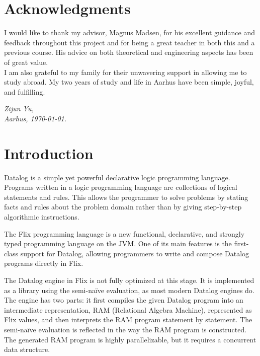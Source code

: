\documentclass[11pt]{report}
\theoremstyle{definition}
\newcommand{\todo}[1]{{\color[rgb]{.5,0,0}\textbf{$\blacktriangleright$#1$\blacktriangleleft$}}}
\begin{document}

\chapter*{Acknowledgments}

I would like to thank my advisor, Magnus Madsen, for his excellent guidance and feedback throughout this project and for being a great teacher in both this and a previous course. His advice on both theoretical and engineering aspects has been of great value.\\
I am also grateful to my family for their unwavering support in allowing me to study abroad. My two years of study and life in Aarhus have been simple, joyful, and fulfilling.

\vspace{2ex}
\begin{flushright}
  \emph{Zijun Yu,}\\
  \emph{Aarhus, \today.}
\end{flushright}

\tableofcontents
\cleardoublepage
{}
\setcounter{secnumdepth}{2}


\chapter{Introduction}
\label{ch:intro}

Datalog is a simple yet powerful declarative logic programming language. Programs written in a logic programming language are collections of logical statements and rules. This allows the programmer to solve problems by stating facts and rules about the problem domain rather than by giving step-by-step algorithmic instructions.

The Flix programming language is a new functional, declarative, and strongly typed programming language on the JVM. One of its main features is the first-class support for Datalog, allowing programmers to write and compose Datalog programs directly in Flix.

The Datalog engine in Flix is not fully optimized at this stage. It is implemented as a library using the semi-naïve evaluation, as most modern Datalog engines do. The engine has two parts: it first compiles the given Datalog program into an intermediate representation, RAM (Relational Algebra Machine), represented as Flix values, and then interprets the RAM program statement by statement. The semi-naïve evaluation is reflected in the way the RAM program is constructed. The generated RAM program is highly parallelizable, but it requires a concurrent data structure.
\end{document}
